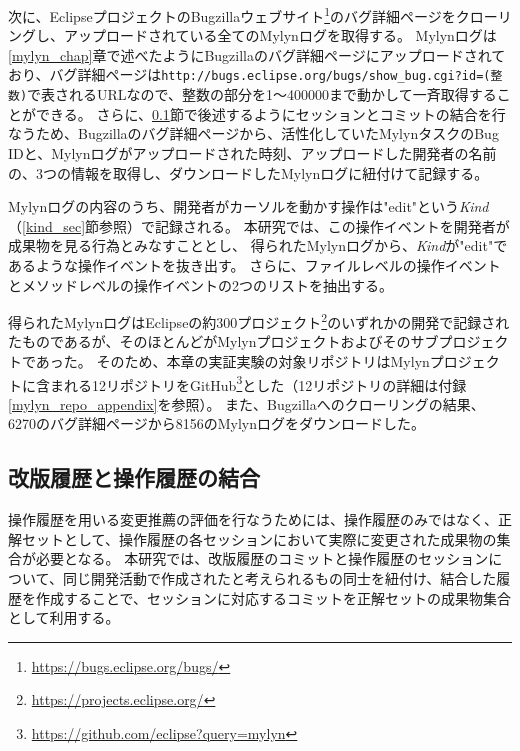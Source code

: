 \documentclass[a4paper]{jsbook}
\begin{document}
次に、EclipseプロジェクトのBugzillaウェブサイト\footnote{\url{https://bugs.eclipse.org/bugs/}}のバグ詳細ページをクローリングし、アップロードされている全てのMylynログを取得する。
Mylynログは\ref{mylyn_chap}章で述べたようにBugzillaのバグ詳細ページにアップロードされており、バグ詳細ページは\texttt{http://bugs.eclipse.org/bugs/show\_bug.cgi?id=(整数)}で表されるURLなので、整数の部分を1〜400000まで動かして一斉取得することができる。
さらに、\ref{joining_sec}節で後述するようにセッションとコミットの結合を行なうため、Bugzillaのバグ詳細ページから、活性化していたMylynタスクのBug IDと、Mylynログがアップロードされた時刻、アップロードした開発者の名前の、3つの情報を取得し、ダウンロードしたMylynログに紐付けて記録する。

Mylynログの内容のうち、開発者がカーソルを動かす操作は"edit"という{\it Kind}（\ref{kind_sec}節参照）で記録される。
本研究では、この操作イベントを開発者が成果物を見る行為とみなすこととし、
得られたMylynログから、{\it Kind}が"edit"であるような操作イベントを抜き出す。
さらに、ファイルレベルの操作イベントとメソッドレベルの操作イベントの2つのリストを抽出する。

得られたMylynログはEclipseの約300プロジェクト\footnote{\url{https://projects.eclipse.org/}}のいずれかの開発で記録されたものであるが、そのほとんどがMylynプロジェクトおよびそのサブプロジェクトであった。
そのため、本章の実証実験の対象リポジトリはMylynプロジェクトに含まれる12リポジトリをGitHub\footnote{\url{https://github.com/eclipse?query=mylyn}}とした（12リポジトリの詳細は付録\ref{mylyn_repo_appendix}を参照）。
また、Bugzillaへのクローリングの結果、6270のバグ詳細ページから8156のMylynログをダウンロードした。

\subsection{改版履歴と操作履歴の結合}\label{joining_sec}
操作履歴を用いる変更推薦の評価を行なうためには、操作履歴のみではなく、正解セットとして、操作履歴の各セッションにおいて実際に変更された成果物の集合が必要となる。
本研究では、改版履歴のコミットと操作履歴のセッションについて、同じ開発活動で作成されたと考えられるもの同士を紐付け、結合した履歴を作成することで、セッションに対応するコミットを正解セットの成果物集合として利用する。
\end{document}
